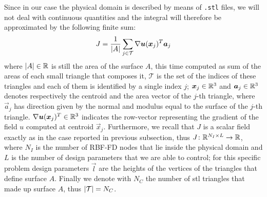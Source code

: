 Since in our case the physical domain is described by means of \verb*|.stl| files, we will not deal with continuous quantities and the integral will therefore be approximated by the following finite sum:
\begin{equation}
	J = \frac{1}{\lvert A\rvert} \sum_{j \in \mathcal{T}} \nabla \boldsymbol{u}(\boldsymbol{x}_j)^T \boldsymbol{a}_j
\end{equation}
where $\lvert A\rvert \in \mathbb{R}$ is still the area of the surface $A$, this time computed as sum of the areas of each small triangle that composes it, $\mathcal{T}$ is the set of the indices of these triangles and each of them is identified by a single index $j$; $\boldsymbol{x}_j \in \mathbb{R}^3$ and $\boldsymbol{a}_j \in \mathbb{R}^3$ denotes respectively the centroid and the area vector of the $j$-th triangle, where $\vec{a}_j$ has direction given by the normal and modulus equal to the surface of the $j$-th triangle.
$\nabla \boldsymbol{u}(\boldsymbol{x}_j)^T \in \mathbb{R}^3$ indicates the row-vector representing the gradient of the field $u$ computed at centroid $\vec{x}_j$.
Furthermore, we recall that $J$ is a scalar field exactly as in the case reported in previous subsection, thus $J \colon \mathbb{R}^{N_I \times L} \to \mathbb{R}$, where $N_I$ is the number of RBF-FD nodes that lie inside the physical domain and $L$ is the number of design parameters that we are able to control; for this specific problem design parameters $\vec{l}$ are the heights of the vertices of the triangles that define surface $A$. Finally we denote with $N_C$ the number of stl triangles that made up surface $A$, thus $\lvert\mathcal{T}\rvert = N_C$.



